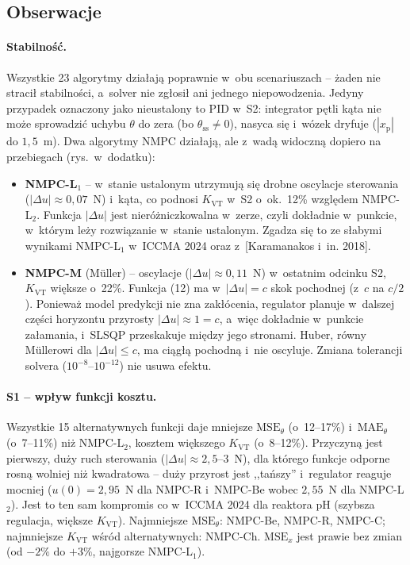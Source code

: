 \subsection{Obserwacje}

\paragraph{Stabilność.} Wszystkie 23 algorytmy działają poprawnie w~obu scenariuszach -- żaden
nie stracił stabilności, a~solver nie zgłosił ani jednego niepowodzenia. Jedyny przypadek
oznaczony jako nieustalony to PID w~S2: integrator pętli kąta nie może sprowadzić uchybu
$\theta$ do zera (bo $\theta_\mathrm{ss}\neq0$), nasyca się i~wózek dryfuje
($|x_\mathrm{p}|$ do $1{,}5$~m). Dwa algorytmy NMPC działają, ale z~wadą widoczną dopiero na
przebiegach (rys.~w~dodatku):
\begin{itemize}
\item \textbf{NMPC-L$_1$} -- w~stanie ustalonym utrzymują się drobne oscylacje sterowania
($|\Delta u|\approx0{,}07$~N) i~kąta, co podnosi $K_\mathrm{VT}$ w~S2 o~ok.~12\% względem
NMPC-L$_2$. Funkcja $|\Delta u|$ jest nieróżniczkowalna w~zerze, czyli dokładnie w~punkcie,
w~którym leży rozwiązanie w~stanie ustalonym. Zgadza się to ze słabymi wynikami NMPC-L$_1$
w~ICCMA 2024 oraz z~[Karamanakos i~in. 2018].
\item \textbf{NMPC-M} (Müller) -- oscylacje ($|\Delta u|\approx0{,}11$~N) w~ostatnim odcinku S2,
$K_\mathrm{VT}$ większe o~22\%. Funkcja (12) ma w~$|\Delta u|=c$ skok pochodnej (z~$c$ na
$c/2$). Ponieważ model predykcji nie zna zakłócenia, regulator planuje w~dalszej części
horyzontu przyrosty $|\Delta u|\approx1=c$, a~więc dokładnie w~punkcie załamania, i~SLSQP
przeskakuje między jego stronami. Huber, równy Müllerowi dla $|\Delta u|\le c$, ma ciągłą
pochodną i~nie oscyluje. Zmiana tolerancji solvera ($10^{-8}$--$10^{-12}$) nie usuwa efektu.
\end{itemize}

\paragraph{S1 -- wpływ funkcji kosztu.} Wszystkie 15 alternatywnych funkcji daje mniejsze
$\mathrm{MSE}_\theta$ (o~12--17\%) i~$\mathrm{MAE}_\theta$ (o~7--11\%) niż NMPC-L$_2$, kosztem
większego $K_\mathrm{VT}$ (o~8--12\%). Przyczyną jest pierwszy, duży ruch sterowania
($|\Delta u|\approx2{,}5$--$3$~N), dla którego funkcje odporne rosną wolniej niż kwadratowa --
duży przyrost jest ,,tańszy'' i~regulator reaguje mocniej ($u(0)=2{,}95$~N dla NMPC-R
i~NMPC-Be wobec $2{,}55$~N dla NMPC-L$_2$). Jest to ten sam kompromis co w~ICCMA 2024 dla
reaktora pH (szybsza regulacja, większe $K_\mathrm{VT}$). Najmniejsze $\mathrm{MSE}_\theta$:
NMPC-Be, NMPC-R, NMPC-C; najmniejsze $K_\mathrm{VT}$ wśród alternatywnych: NMPC-Ch.
$\mathrm{MSE}_x$ jest prawie bez zmian (od $-2\%$ do $+3\%$, najgorsze NMPC-L$_1$).

